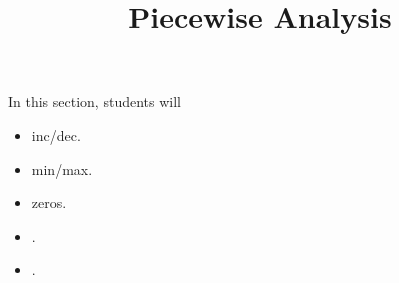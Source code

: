 \documentclass{ximera}
\title{Piecewise Analysis}
\begin{document}
\begin{abstract}
\end{abstract}
\maketitle

\begin{sectionOutcomes}
In this section, students will 

\begin{itemize}
\item inc/dec.
\item min/max.
\item zeros.
\item .
\item .
\end{itemize}
\end{sectionOutcomes}
\end{document}
